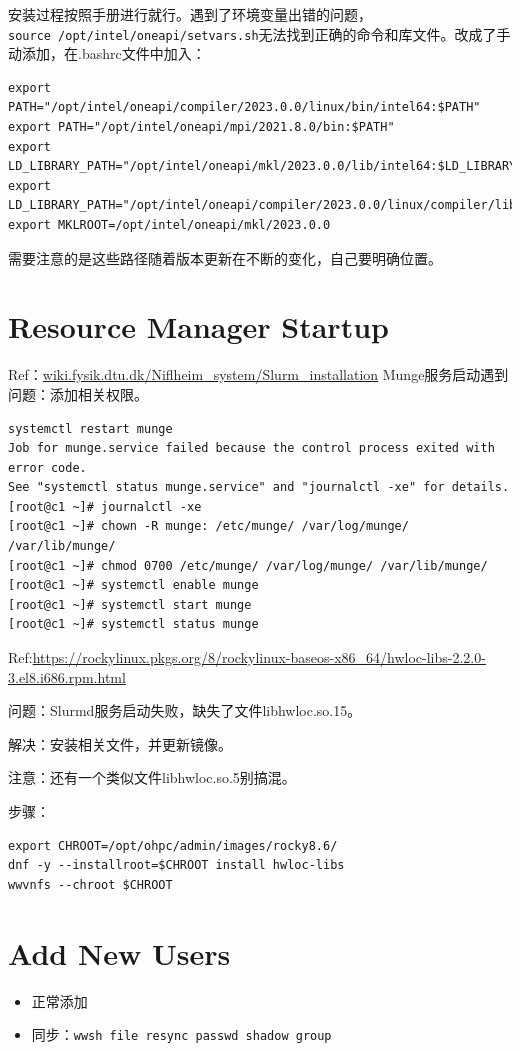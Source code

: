 {安装过程按照手册进行就行。遇到了环境变量出错的问题，\\
\verb|source /opt/intel/oneapi/setvars.sh|无法找到正确的命令和库文件。改成了手动添加，在.bashrc文件中加入：
{\tiny
\begin{verbatim}
export PATH="/opt/intel/oneapi/compiler/2023.0.0/linux/bin/intel64:$PATH"
export PATH="/opt/intel/oneapi/mpi/2021.8.0/bin:$PATH"
export LD_LIBRARY_PATH="/opt/intel/oneapi/mkl/2023.0.0/lib/intel64:$LD_LIBRARY_PATH"
export LD_LIBRARY_PATH="/opt/intel/oneapi/compiler/2023.0.0/linux/compiler/lib/intel64_lin:$LD_LIBRARY_PATH"
export MKLROOT=/opt/intel/oneapi/mkl/2023.0.0
\end{verbatim}
}
需要注意的是这些路径随着版本更新在不断的变化，自己要明确位置。



\section{Resource Manager Startup}
Ref：\url{wiki.fysik.dtu.dk/Niflheim_system/Slurm_installation}
Munge服务启动遇到问题：添加相关权限。
\begin{verbatim}
systemctl restart munge
Job for munge.service failed because the control process exited with error code.
See "systemctl status munge.service" and "journalctl -xe" for details.
[root@c1 ~]# journalctl -xe
[root@c1 ~]# chown -R munge: /etc/munge/ /var/log/munge/ /var/lib/munge/
[root@c1 ~]# chmod 0700 /etc/munge/ /var/log/munge/ /var/lib/munge/
[root@c1 ~]# systemctl enable munge
[root@c1 ~]# systemctl start munge
[root@c1 ~]# systemctl status munge
\end{verbatim}


Ref:\url{https://rockylinux.pkgs.org/8/rockylinux-baseos-x86_64/hwloc-libs-2.2.0-3.el8.i686.rpm.html}

问题：Slurmd服务启动失败，缺失了文件libhwloc.so.15。

解决：安装相关文件，并更新镜像。

注意：还有一个类似文件libhwloc.so.5别搞混。

步骤：
\begin{verbatim}
export CHROOT=/opt/ohpc/admin/images/rocky8.6/
dnf -y --installroot=$CHROOT install hwloc-libs
wwvnfs --chroot $CHROOT
\end{verbatim}




\section{Add New Users}
\begin{itemize}
\item 正常添加
\item 同步：\verb|wwsh file resync passwd shadow group|
\end{itemize}


}
